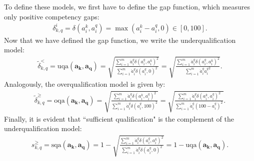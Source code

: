 \documentclass{elsarticle} %
\begin{document}
To define these models, we first have to define the gap function, which measures only positive competency gaps:
\begin{gather}
    \delta_{k,q}^{i} =
    \delta(a_{i}^{k}, a_{i}^{q}) = 
    \max(
        a_{i}^{k} - a_{i}^{q}
        , 0
    )
    \in [0, 100]
    .
\end{gather}
Now that we have defined the gap function, we write the underqualification model:
\begin{gather}
    \tilde{\delta}_{k,q}^{<} = 
    \text{uqa}(\boldsymbol{a_k}, \boldsymbol{a_q}) =
    \sqrt{
        \frac{
            \sum_{i=1}^{m}{
                \ddot{a}_{i}^{q} {\delta(a_{i}^{q}, a_{i}^{k})} ^ 2
            }
        }{
            \sum_{i=1}^{m}{
                \ddot{a}_{i}^{q} {\delta(a_{i}^{q}, 0)} ^ 2
            }
        }
    } =
    \sqrt{
        \frac{
            \sum_{i=1}^{m}{
                \ddot{a}_{i}^{q} {\delta(a_{i}^{q}, a_{i}^{k})} ^ 2
            }
        }{
            \sum_{i=1}^{m}{
                \ddot{a}_{i}^{q} {a_{i}^{q}} ^ 2
            }
        }
    }
    .
\end{gather}
Analogously, the overqualification model is given by:
\begin{gather}
    \tilde{\delta}_{k,q}^{\geq} = 
    \text{oqa}(\boldsymbol{a_k}, \boldsymbol{a_q}) =
    \sqrt{
        \frac{
            \sum_{i=1}^{m}{
                \ddot{a}_{i}^{q} {\delta(a_{i}^{k}, a_{i}^{q})} ^ 2
            }
        }{
            \sum_{i=1}^{m}{
                \ddot{a}_{i}^{q} {\delta(a_{i}^{q}, 100)} ^ 2
            }
        }
    } =
    \sqrt{
        \frac{
            \sum_{i=1}^{m}{
                \ddot{a}_{i}^{q} {\delta(a_{i}^{k}, a_{i}^{q})} ^ 2
            }
        }{
            \sum_{i=1}^{m}{
                \ddot{a}_{i}^{q} {(100 - a_{i}^{q})} ^ 2
            }
        }
    }
    .
\end{gather}
Finally, it is evident that ``sufficient qualification" is the complement of the underqualification model:
\begin{gather}
    s_{k,q}^{\geq} =
    \text{sqa}(\boldsymbol{a_k}, \boldsymbol{a_q}) =
    1 - 
    \sqrt{
        \frac{
            \sum_{i=1}^{m}{
                \ddot{a}_{i}^{q} {\delta(a_{i}^{q}, a_{i}^{k})} ^ 2
            }
        }{
            \sum_{i=1}^{m}{
                \ddot{a}_{i}^{q} {\delta(a_{i}^{q}, 0)} ^ 2
            }
        }
    } =
    1 - \text{uqa}(\boldsymbol{a_k}, \boldsymbol{a_q})
    .
\end{gather}
\end{document}
